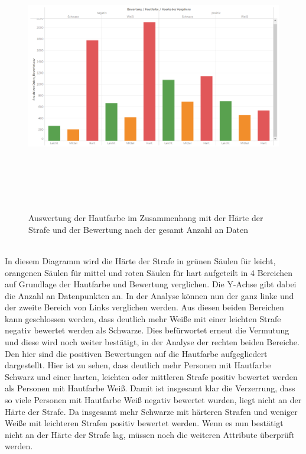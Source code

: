 \begin{onehalfspace}
\begin{figure}[!h]
    \includegraphics[width=16cm,height=12cm]{Diagramme/Tab_Haut2.PNG}
    \caption{Auswertung der Hautfarbe im Zusammenhang mit der Härte der Strafe und der Bewertung nach der gesamt Anzahl an Daten}
    \label{fig:TabHaut2}
\end{figure}\\
In diesem Diagramm wird die Härte der Strafe in grünen Säulen für leicht, orangenen Säulen für mittel und roten Säulen für hart aufgeteilt in 4 Bereichen auf Grundlage der Hautfarbe und Bewertung verglichen. Die Y-Achse gibt dabei die Anzahl an Datenpunkten an. In der Analyse können nun der ganz linke und der zweite Bereich von Links verglichen werden. Aus diesen beiden Bereichen kann geschlossen werden, dass deutlich mehr Wei{\ss}e mit einer leichten Strafe negativ bewertet werden als Schwarze. Dies befürwortet erneut die Vermutung und diese wird noch weiter bestätigt, in der Analyse der rechten beiden Bereiche. Den hier sind die positiven Bewertungen auf die Hautfarbe aufgegliedert dargestellt. Hier ist zu sehen, dass deutlich mehr Personen mit Hautfarbe Schwarz und einer harten, leichten oder mittleren Strafe positiv bewertet werden als Personen mit Hautfarbe Wei{\ss}. Damit ist insgesamt klar die Verzerrung, dass so viele Personen mit Hautfarbe Wei{\ss} negativ bewertet wurden, liegt nicht an der Härte der Strafe. Da insgesamt mehr Schwarze mit härteren Strafen und weniger Wei{\ss}e mit leichteren Strafen positiv bewertet werden. Wenn es nun bestätigt nicht an der Härte der Strafe lag, müssen noch die weiteren Attribute überprüft werden.\\

\end{onehalfspace}
